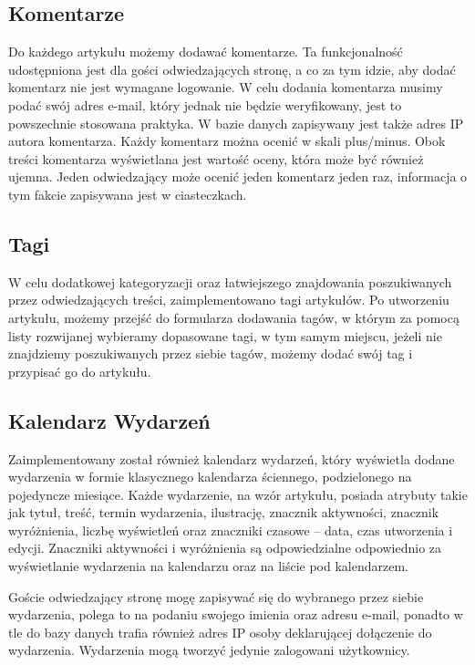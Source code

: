 \documentclass[openright]{xmgr}
\begin{document}
\subsection{Komentarze}
Do każdego artykułu możemy dodawać komentarze. Ta funkcjonalność udostępniona jest dla gości odwiedzających stronę, a co za tym idzie, aby dodać komentarz nie jest wymagane logowanie. W celu dodania komentarza musimy podać swój adres e-mail, który jednak nie będzie weryfikowany, jest to powszechnie stosowana praktyka. W bazie danych zapisywany jest także adres IP autora komentarza. Każdy komentarz można ocenić w skali plus/minus. Obok treści komentarza wyświetlana jest wartość oceny, która może być również ujemna. Jeden odwiedzający może ocenić jeden komentarz jeden raz, informacja o tym fakcie zapisywana jest w ciasteczkach.

\newpage

\subsection{Tagi}
W celu dodatkowej kategoryzacji oraz łatwiejszego znajdowania poszukiwanych przez odwiedzających treści, zaimplementowano tagi artykułów. Po utworzeniu artykułu, możemy przejść do formularza dodawania tagów, w którym za pomocą listy rozwijanej wybieramy dopasowane tagi, w tym samym miejscu, jeżeli nie znajdziemy poszukiwanych przez siebie tagów, możemy dodać swój tag i przypisać go do artykułu.

\subsection{Kalendarz Wydarzeń}
Zaimplementowany został również kalendarz wydarzeń, który wyświetla dodane wydarzenia w formie klasycznego kalendarza ściennego, podzielonego na pojedyncze miesiące. Każde wydarzenie, na wzór artykułu, posiada atrybuty takie jak tytuł, treść, termin wydarzenia, ilustrację, znacznik aktywności, znacznik wyróżnienia, liczbę wyświetleń oraz znaczniki czasowe – data, czas utworzenia i edycji. Znaczniki aktywności i wyróżnienia są odpowiedzialne odpowiednio za wyświetlanie wydarzenia na kalendarzu oraz na liście pod kalendarzem. 

Goście odwiedzający stronę mogę zapisywać się do wybranego przez siebie wydarzenia, polega to na podaniu swojego imienia oraz adresu e-mail, ponadto w tle do bazy danych trafia również adres IP osoby deklarującej dołączenie do wydarzenia. Wydarzenia mogą tworzyć jedynie zalogowani użytkownicy.
\end{document}

